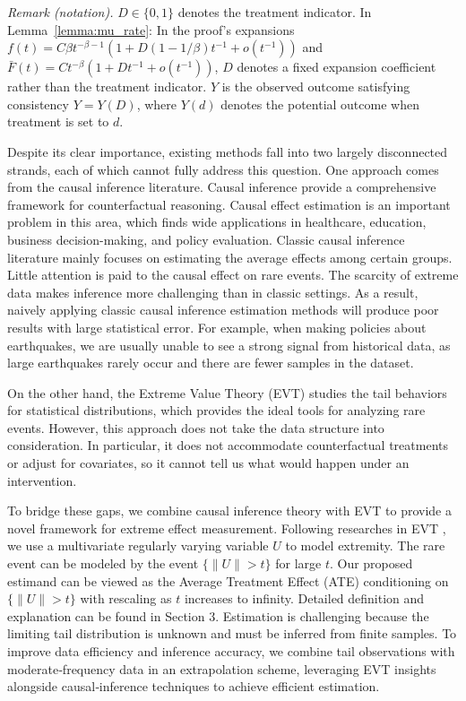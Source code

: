 \documentclass[12pt]{article}
\theoremstyle{plain}
\theoremstyle{definition}
\begin{document}
\noindent\textit{Remark (notation).} $D\in\{0,1\}$ denotes the treatment indicator. In Lemma~\ref{lemma:mu_rate}: In the proof's expansions $f(t)=C\beta t^{-\beta-1}(1+D(1-1/\beta)t^{-1}+o(t^{-1}))$ and $\bar F(t)=Ct^{-\beta}(1+Dt^{-1}+o(t^{-1}))$, $D$ denotes a fixed expansion coefficient rather than the treatment indicator. $Y$ is the observed outcome satisfying consistency $Y=Y(D)$, where $Y(d)$ denotes the potential outcome when treatment is set to $d$.


Despite its clear importance, existing methods fall into two largely disconnected strands, each of which cannot fully address this question. One approach comes from the causal inference literature. Causal inference provide a comprehensive framework for counterfactual reasoning. Causal effect estimation is an important problem in this area, which finds wide applications in healthcare, education, business decision-making, and policy evaluation.  Classic causal inference literature mainly focuses on estimating the average effects among certain groups. Little attention is paid to the causal effect on rare events. The scarcity of extreme data makes inference more challenging than in classic settings. As a result, naively applying classic causal inference estimation methods will produce poor results with large statistical error.  For example, when making policies about earthquakes, we are usually unable to see a strong signal from historical data, as large earthquakes rarely occur and there are fewer samples in the dataset.

On the other hand, the Extreme Value Theory (EVT) studies the tail behaviors for statistical distributions, which provides the ideal tools for analyzing rare events. However, this approach does not take the data structure into consideration. In particular, it does not accommodate counterfactual treatments or adjust for covariates, so it cannot tell us what would happen under an intervention. 

To bridge these gaps, we combine causal inference theory with EVT to provide a novel framework for extreme effect measurement. Following researches in EVT \cite{coles2001introduction}, we use a multivariate regularly varying variable $U$ to model extremity. The rare event can be modeled by the event $\{\|U\| > t\}$ for large $t$. Our proposed estimand can be viewed as the Average Treatment Effect (ATE) conditioning on $\{\|U\| > t\}$ with rescaling as $t$ increases to infinity. Detailed definition and explanation can be found in Section 3. Estimation is challenging because the limiting tail distribution is unknown and must be inferred from finite samples. To improve data efficiency and inference accuracy, we combine tail observations with moderate‐frequency data in an extrapolation scheme, leveraging EVT insights alongside causal‐inference techniques to achieve efficient estimation.
\end{document}
